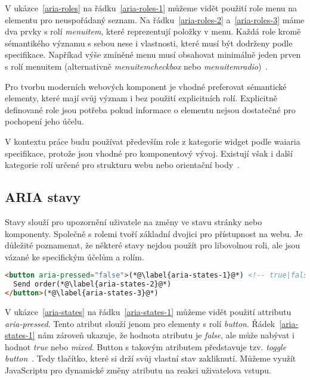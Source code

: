 V ukázce~\ref{aria-roles} na řádku~\ref{aria-roles-1} můžeme vidět použití role menu na elementu pro neuspořádaný seznam.
Na řádku~\ref{aria-roles-2} a~\ref{aria-roles-3} máme dva prvky s rolí \textit{menuitem}, které reprezentují položky v menu.
Každá role kromě sémantikého významu s sebou nese i vlastnosti, které musí být dodrženy podle specifikace.
Napříkad výše zmíněné menu musí obsahovat minimálně jeden prven s rolí menuitem (alternativně \textit{menuitemcheckbox} nebo \textit{menuitemradio})~\cite{wai-required-owned-elements,wai-standard-guidelines-required-owned-elements}.

Pro tvorbu moderních webových komponent je vhodné preferovat sémantické elementy, které mají svůj význam i bez použití explicitních rolí.
Explicitně definované role jsou potřeba pokud informace o elementu nejsou dostatečné pro pochopení jeho účelu.

V kontextu práce budu používat především role z kategorie widget podle \gls{waiaria} specifikace, protože jsou vhodné pro komponentový vývoj.
Existují však i další kategorie rolí určené pro strukturu webu nebo orientační body~\cite{wai-catorization-of-roles}.

\subsection{ARIA stavy}

Stavy slouží pro upozornění uživatele na změny ve stavu stránky nebo komponenty.
Společně s rolemi tvoří základní dvojici pro přístupnost na webu.
Je důležité poznamenat, že některé stavy nejdou použít pro libovolnou roli, ale jsou vázané ke specifickým účelům a rolím.

\begin{lstlisting}[caption={Aria stavové atributy}, label={aria-states}, language=html]
<button aria-pressed="false">(*@\label{aria-states-1}@*) <!-- true|false|mixed -->
  Send order(*@\label{aria-states-2}@*)
</button>(*@\label{aria-states-3}@*)
\end{lstlisting}

V ukázce~\ref{aria-states} na řádku~\ref{aria-states-1} můžeme vidět použití attributu \textit{aria-pressed}.
Tento atribut slouží jenom pro elementy s rolí \textit{button}.
Řádek~\ref{aria-states-1} nám zároveň ukazuje, že hodnota atributu je \textit{false}, ale může nabývat i hodnot \textit{true} nebo \textit{mixed}.
Button s takovým atributem představuje tzv. \textit{toggle button}~\cite{mdn-aria-pressed}. Tedy tlačítko, které si drží svůj vlastní stav zakliknutí.
Můžeme využít JavaScriptu pro dynamické změny atributu na reakci uživatelova vstupu.

